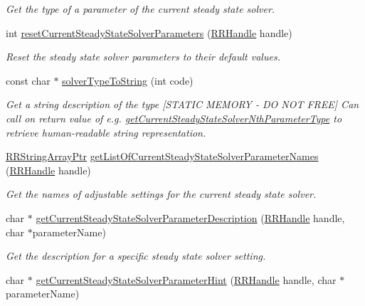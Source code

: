 \begin{DoxyCompactItemize}
\begin{DoxyCompactList}\small\item\em Get the type of a parameter of the current steady state solver. \end{DoxyCompactList}\item 
int \hyperlink{group__simopts_gafccd26495f4b099700e8f52fdb20794a}{reset\+Current\+Steady\+State\+Solver\+Parameters} (\hyperlink{rrc__types_8h_a1d68f0592372208fa5a5f2799ea4b3ae}{R\+R\+Handle} handle)
\begin{DoxyCompactList}\small\item\em Reset the steady state solver parameters to their default values. \end{DoxyCompactList}\item 
const char $\ast$ \hyperlink{group__simopts_ga756168c1c856360e327f017ac7578333}{solver\+Type\+To\+String} (int code)
\begin{DoxyCompactList}\small\item\em Get a string description of the type \mbox{[}S\+T\+A\+T\+I\+C M\+E\+M\+O\+R\+Y -\/ D\+O N\+O\+T F\+R\+E\+E\mbox{]}  Can call on return value of e.\+g. \hyperlink{group__simopts_ga77dcaf609de8b7c9ff829e26f02695b0}{get\+Current\+Steady\+State\+Solver\+Nth\+Parameter\+Type} to retrieve human-\/readable string representation. \end{DoxyCompactList}\item 
\hyperlink{rrc__types_8h_a7c9475df6c7337d99482b13a365e7596}{R\+R\+String\+Array\+Ptr} \hyperlink{group__simopts_gaab9cc86032339b6275487ca0be59b853}{get\+List\+Of\+Current\+Steady\+State\+Solver\+Parameter\+Names} (\hyperlink{rrc__types_8h_a1d68f0592372208fa5a5f2799ea4b3ae}{R\+R\+Handle} handle)
\begin{DoxyCompactList}\small\item\em Get the names of adjustable settings for the current steady state solver. \end{DoxyCompactList}\item 
char $\ast$ \hyperlink{group__simopts_ga4e00e2cbee01bc5b91c0ae6cfb454b75}{get\+Current\+Steady\+State\+Solver\+Parameter\+Description} (\hyperlink{rrc__types_8h_a1d68f0592372208fa5a5f2799ea4b3ae}{R\+R\+Handle} handle, char $\ast$parameter\+Name)
\begin{DoxyCompactList}\small\item\em Get the description for a specific steady state solver setting. \end{DoxyCompactList}\item 
char $\ast$ \hyperlink{group__simopts_gae754a6adb94adcc4ff2f653f8f10c273}{get\+Current\+Steady\+State\+Solver\+Parameter\+Hint} (\hyperlink{rrc__types_8h_a1d68f0592372208fa5a5f2799ea4b3ae}{R\+R\+Handle} handle, char $\ast$parameter\+Name)

\end{DoxyCompactItemize}
